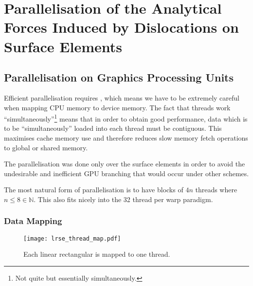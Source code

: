 \chapter{Parallelisation of the Analytical Forces Induced by Dislocations on Surface Elements}
\label{c:para_f_dln_se}
%
\section{Parallelisation on Graphics Processing Units}
Efficient parallelisation requires , which means we have to be extremely careful when mapping CPU memory to device memory. The fact that threads work ``simultaneously''\footnote{Not quite but essentially simultaneously.} means that in order to obtain good performance, data which is to be ``simultaneously'' loaded into each thread must be contiguous. This maximises cache memory use and therefore reduces slow memory fetch operations to global or shared memory.

The parallelisation was done only over the surface elements in order to avoid the undesirable and inefficient GPU branching that would occur under other schemes.

The most natural form of parallelisation is to have blocks of $ 4n $ threads where $ n \leq 8 \in \mathbb{N}$. This also fits nicely into the 32 thread per warp paradigm.
%
\subsection{Data Mapping}
%
\begin{figure}
	\centering
	\texttt{[image: lrse\_thread\_map.pdf]}
	\caption[Linear rectangular surface element mapping.]{Each linear rectangular  is mapped to one thread.}
	\label{f:lrse_map}
\end{figure}
%

